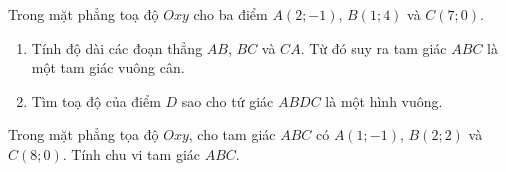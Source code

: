\begin{bt}%
	Trong mặt phẳng toạ độ $Oxy$ cho ba điểm $A(2;-1)$, $B(1;4)$ và $C(7;0)$.
	\begin{enumerate}
		\item Tính độ dài các đoạn thẳng $AB$, $BC$ và $CA$. Từ đó suy ra tam giác $ABC$ là một tam giác vuông cân.
		\item Tìm toạ độ của điểm $D$ sao cho tứ giác $ABDC$ là một hình vuông.
	\end{enumerate}
\end{bt}

\begin{bt}%
	Trong mặt phẳng tọa độ $Oxy$, cho tam giác $ABC$ có $A(1;-1)$, $B(2;2)$ và $C(8;0)$. Tính chu vi tam giác $ABC$.
\end{bt}

